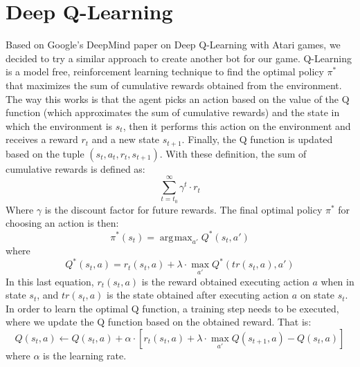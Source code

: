 \documentclass{article}
\DeclareMathOperator*{\argmax}{arg\!max}
\begin{document}
	
	\section{Deep Q-Learning}
	Based on Google's DeepMind paper on Deep Q-Learning with Atari games, we decided to try a similar approach to create another bot for our game. Q-Learning  is a model free, reinforcement learning technique to find the optimal policy $\pi^*$ that maximizes the sum of cumulative rewards obtained from the environment. The way this works is that the agent picks an action based on the value of the Q function (which approximates the sum of cumulative rewards) and the state in which the environment is $s_t$, then it performs this action on the environment and receives a reward $r_t$ and a new state $s_{t+1}$. Finally, the Q function is updated based on the tuple $(s_t,a_t,r_t,s_{t+1})$. With these definition, the sum of cumulative rewards is defined as: 
	\begin{equation}
	 \sum_{t=t_0}^\infty\gamma^t\cdot r_t   
	\end{equation}
	Where $\gamma$ is the discount factor for future rewards. The final optimal policy $\pi^*$ for choosing an action is then:
	\begin{equation}
	    \pi^*(s_t) = \argmax_{a'}Q^*(s_t,a')
	\end{equation}
	where
	\begin{equation}
	    Q^*(s_t,a) = r_t(s_t,a) + \lambda \cdot \max_{a'}Q^*(tr(s_t, a), a')
	\end{equation}
	In this last equation, $r_t(s_t,a)$ is the reward obtained executing action $a$ when in state $s_t$, and $tr(s_t, a)$ is the state obtained after executing action $a$ on state $s_t$. In order to learn the optimal Q function, a training step needs to be executed, where we update the Q function based on the obtained reward. That is:
	\begin{equation}
	    Q(s_t, a) \leftarrow Q(s_t,a) + \alpha\cdot[r_t(s_t,a)+\lambda\cdot\max_{a'}Q(s_{t+1},a) - Q(s_t,a)]
	\end{equation}
	where $\alpha$ is the learning rate.
	
\end{document}

